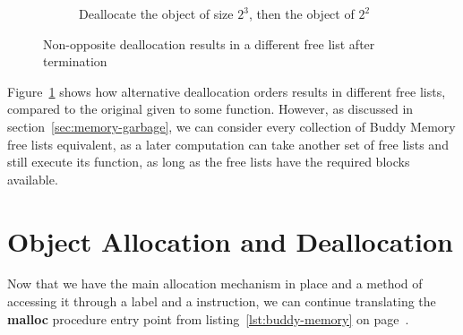 \begin{figure}[ht]
\begin{subfigure}{.5\textwidth}
        \caption{\footnotesize Deallocate the object of size $2^3$, then the object of $2^2$}
    \end{subfigure}%
    \caption{Non-opposite deallocation results in a different free list after termination}
    \label{fig:deallocation-order-free-list}
\end{figure}

Figure~\ref{fig:deallocation-order-free-list} shows how alternative deallocation orders results in different free lists, compared to the original given to some function. However, as discussed in section~\ref{sec:memory-garbage}, we can consider every collection of Buddy Memory free lists equivalent, as a later computation can take another set of free lists and still execute its function, as long as the free lists have the required blocks available.

\newpage
\section{Object Allocation and Deallocation}
\label{sec:object-allocation-deallocation}
Now that we have the main allocation mechanism in place and a method of accessing it through a label and a  instruction, we can continue translating the \textbf{malloc} procedure entry point from listing~\ref{lst:buddy-memory} on page~\pageref{lst:buddy-memory}.

